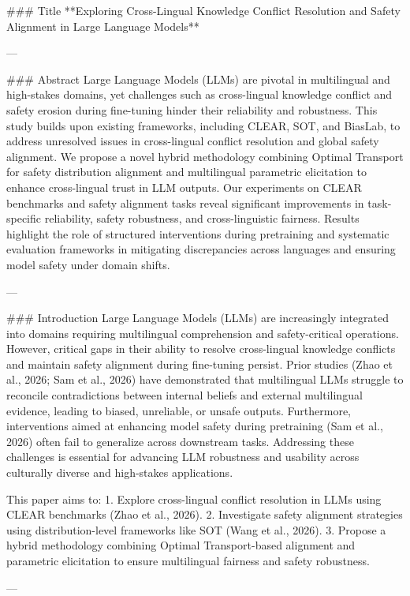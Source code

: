 ### Title  
**Exploring Cross-Lingual Knowledge Conflict Resolution and Safety Alignment in Large Language Models**

---

### Abstract  
Large Language Models (LLMs) are pivotal in multilingual and high-stakes domains, yet challenges such as cross-lingual knowledge conflict and safety erosion during fine-tuning hinder their reliability and robustness. This study builds upon existing frameworks, including CLEAR, SOT, and BiasLab, to address unresolved issues in cross-lingual conflict resolution and global safety alignment. We propose a novel hybrid methodology combining Optimal Transport for safety distribution alignment and multilingual parametric elicitation to enhance cross-lingual trust in LLM outputs. Our experiments on CLEAR benchmarks and safety alignment tasks reveal significant improvements in task-specific reliability, safety robustness, and cross-linguistic fairness. Results highlight the role of structured interventions during pretraining and systematic evaluation frameworks in mitigating discrepancies across languages and ensuring model safety under domain shifts.

---

### Introduction  
Large Language Models (LLMs) are increasingly integrated into domains requiring multilingual comprehension and safety-critical operations. However, critical gaps in their ability to resolve cross-lingual knowledge conflicts and maintain safety alignment during fine-tuning persist. Prior studies (Zhao et al., 2026; Sam et al., 2026) have demonstrated that multilingual LLMs struggle to reconcile contradictions between internal beliefs and external multilingual evidence, leading to biased, unreliable, or unsafe outputs. Furthermore, interventions aimed at enhancing model safety during pretraining (Sam et al., 2026) often fail to generalize across downstream tasks. Addressing these challenges is essential for advancing LLM robustness and usability across culturally diverse and high-stakes applications.

This paper aims to:  
1. Explore cross-lingual conflict resolution in LLMs using CLEAR benchmarks (Zhao et al., 2026).  
2. Investigate safety alignment strategies using distribution-level frameworks like SOT (Wang et al., 2026).  
3. Propose a hybrid methodology combining Optimal Transport-based alignment and parametric elicitation to ensure multilingual fairness and safety robustness.  

---

